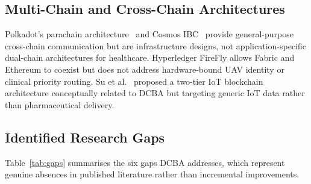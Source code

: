 \documentclass[sigplan,screen,review=false]{acmart}
\begin{document}
\subsection{Multi-Chain and Cross-Chain Architectures}

Polkadot's parachain architecture~\cite{wood2016polkadot} and Cosmos
IBC~\cite{buchman2019cosmos} provide general-purpose cross-chain
communication but are infrastructure designs, not application-specific
dual-chain architectures for healthcare. Hyperledger FireFly allows
Fabric and Ethereum to coexist but does not address hardware-bound UAV
identity or clinical priority routing. Su et al.~\cite{su2020twotier}
proposed a two-tier IoT blockchain architecture conceptually related to
DCBA but targeting generic IoT data rather than pharmaceutical delivery.

\subsection{Identified Research Gaps}

Table~\ref{tab:gaps} summarises the six gaps DCBA addresses, which
represent genuine absences in published literature rather than
incremental improvements.
\end{document}

